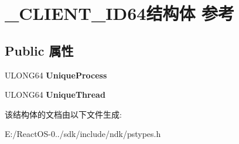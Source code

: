 \hypertarget{struct___c_l_i_e_n_t___i_d64}{}\section{\+\_\+\+C\+L\+I\+E\+N\+T\+\_\+\+I\+D64结构体 参考}
\label{struct___c_l_i_e_n_t___i_d64}
\subsection*{Public 属性}
\begin{DoxyCompactItemize}
\item 
\mbox{\label{struct___c_l_i_e_n_t___i_d64_aa853a3c35e10e1de18ced73133465ac6}} 
U\+L\+O\+N\+G64 {\bfseries Unique\+Process}
\item 
\mbox{\label{struct___c_l_i_e_n_t___i_d64_a0afedf1d663c7ffcd33e410d1436d86f}} 
U\+L\+O\+N\+G64 {\bfseries Unique\+Thread}
\end{DoxyCompactItemize}


该结构体的文档由以下文件生成\+:\begin{DoxyCompactItemize}
\item 
E\+:/\+React\+O\+S-\/0../sdk/include/ndk/pstypes.\+h\end{DoxyCompactItemize}

